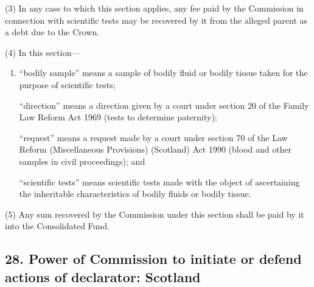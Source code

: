 \documentclass[12pt,a4paper]{article}
\begin{document}
(3) In any case to which this section applies, any fee paid by the 
Commission  %
in connection with scientific tests may be recovered by 
it  %
from the alleged parent as a debt due to the Crown.

(4) In this section—
\begin{enumerate}\item[]
“bodily sample” means a sample of bodily fluid or bodily tissue taken for the purpose of scientific tests;

“direction” means a direction given by a court under section 20 of the Family Law Reform Act 1969 (tests to determine paternity);

“request” means a request made by a court under section 70 of the Law Reform (Miscellaneous Provisions) (Scotland) Act 1990 (blood and other samples in civil proceedings); and

“scientific tests” means scientific tests made with the object of ascertaining the inheritable characteristics of bodily fluids or bodily tissue.
\end{enumerate}

(5) Any sum recovered by the 
Commission  %
under this section shall be paid by 
it  %
into the Consolidated Fund.


\subsection{28. Power of 
Commission  %
to initiate or defend actions of declarator: Scotland}
\end{document}
